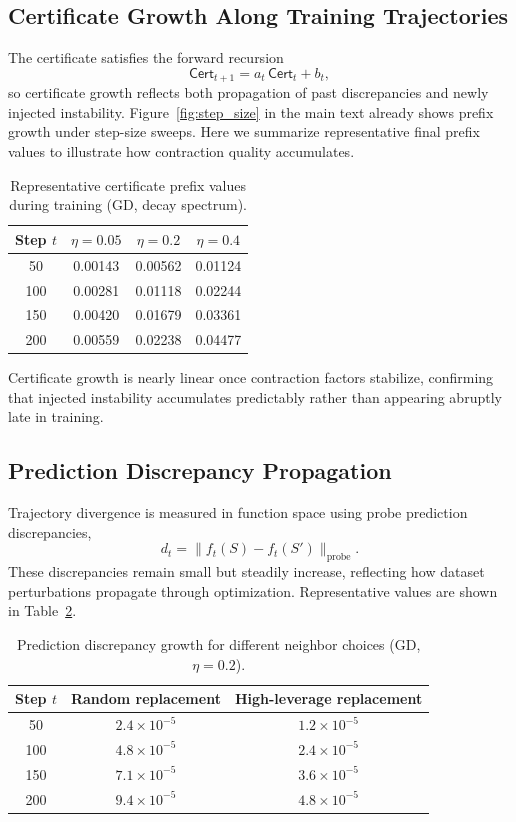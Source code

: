 \documentclass{article}
\numberwithin{equation}{section}
\begin{document}
\subsection{Certificate Growth Along Training Trajectories}

The certificate satisfies the forward recursion
\[
\mathsf{Cert}_{t+1}
=
a_t \,\mathsf{Cert}_t + b_t,
\]
so certificate growth reflects both propagation of past discrepancies and newly injected instability. Figure~\ref{fig:step_size} in the main text already shows prefix growth under step-size sweeps. Here we summarize representative final prefix values to illustrate how contraction quality accumulates.

\begin{table}[h]
	\centering
	\caption{Representative certificate prefix values during training (GD, decay spectrum).}
	\label{tab:cert_growth}
	\begin{tabular}{c|c|c|c}
		\hline
		Step $t$ & $\eta=0.05$ & $\eta=0.2$ & $\eta=0.4$ \\
		\hline
		50  & 0.00143 & 0.00562 & 0.01124 \\
		100 & 0.00281 & 0.01118 & 0.02244 \\
		150 & 0.00420 & 0.01679 & 0.03361 \\
		200 & 0.00559 & 0.02238 & 0.04477 \\
		\hline
	\end{tabular}
\end{table}Certificate growth is nearly linear once contraction factors stabilize, confirming that injected instability accumulates predictably rather than appearing abruptly late in training.

\subsection{Prediction Discrepancy Propagation}

Trajectory divergence is measured in function space using probe prediction discrepancies,
\[
d_t = \| f_t(S) - f_t(S') \|_{\text{probe}}.
\]
These discrepancies remain small but steadily increase, reflecting how dataset perturbations propagate through optimization. Representative values are shown in Table~\ref{tab:probe_growth}.

\begin{table}[h]
	\centering
	\caption{Prediction discrepancy growth for different neighbor choices (GD, $\eta=0.2$).}
	\label{tab:probe_growth}
	\begin{tabular}{c|c|c}
		\hline
		Step $t$ & Random replacement & High-leverage replacement \\
		\hline
		50  & $2.4\times10^{-5}$ & $1.2\times10^{-5}$ \\
		100 & $4.8\times10^{-5}$ & $2.4\times10^{-5}$ \\
		150 & $7.1\times10^{-5}$ & $3.6\times10^{-5}$ \\
		200 & $9.4\times10^{-5}$ & $4.8\times10^{-5}$ \\
		\hline
	\end{tabular}
\end{table}
\end{document}
